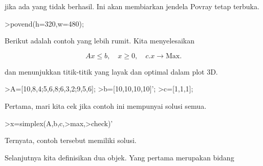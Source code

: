 \documentclass{article}
\begin{document}
\begin{eulernotebook}
\begin{eulercomment}
jika ada yang tidak berhasil. Ini akan membiarkan jendela Povray tetap
terbuka.
\end{eulercomment}
\begin{eulerprompt}
>povend(h=320,w=480);
\end{eulerprompt}
\begin{eulercomment}
Berikut adalah contoh yang lebih rumit. Kita menyelesaikan

\end{eulercomment}
\begin{eulerformula}
\[
Ax \le b, \quad x \ge 0, \quad c.x \to \text{Max.}
\]
\end{eulerformula}
\begin{eulercomment}
dan menunjukkan titik-titik yang layak dan optimal dalam plot 3D.
\end{eulercomment}
\begin{eulerprompt}
>A=[10,8,4;5,6,8;6,3,2;9,5,6];
>b=[10,10,10,10]';
>c=[1,1,1];
\end{eulerprompt}
\begin{eulercomment}
Pertama, mari kita cek jika contoh ini mempunyai solusi semua.
\end{eulercomment}
\begin{eulerprompt}
>x=simplex(A,b,c,>max,>check)'
\end{eulerprompt}
\begin{euleroutput}
  [0,  1,  0.5]
\end{euleroutput}
\begin{eulercomment}
Ternyata, contoh tersebut memiliki solusi.

Selanjutnya kita definisikan dua objek. Yang pertama merupakan bidang


\end{eulercomment}
\end{eulernotebook}
\end{document}
